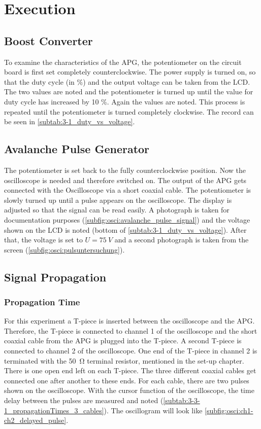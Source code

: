 \chapter{Execution}
    \section{Boost Converter}\label{sec:exec:boost_conv}
        To examine the characteristics of the APG, the potentiometer on the circuit board is first set completely
        counterclockwise. The power supply is turned on, so that the duty cycle (in \%) and the output voltage can be taken from
        the LCD. The two values are noted and the potentiometer is turned up until the value for duty cycle has increased by 10 \%.
        Again the values are noted. This process is repeated until the potentiometer is turned completely clockwise.
        The record can be seen in \cref{subtab:3-1_duty_vs_voltage}.
    \section{Avalanche Pulse Generator}\label{sec:exec:avalanche_p_gen}
        The potentiometer is set back to the fully counterclockwise position. Now the oscilloscope is needed and therefore
        switched on. The output of the APG gets connected with the Oscilloscope via a short coaxial cable. The
        potentiometer is slowly turned up until a pulse appears on the oscilloscope. The display is adjusted so that the signal
        can be read easily. A photograph is taken for documentation purposes (\cref{subfig:osci:avalanche_pulse_signal})
        and the voltage shown on the LCD is noted (bottom of \cref{subtab:3-1_duty_vs_voltage}). After that, the voltage
        is set to \(U = \SI{75}{V}\) and a second photograph is taken from the screen (\cref{subfig:osci:pulsuntersuchung}).
    \section{Signal Propagation}\label{sec:exec:signal_prop}
        \subsection{Propagation Time}\label{subsec:exec:prop_time}
            For this experiment a T-piece is inserted between the oscilloscope and the APG. Therefore, the T-piece is
            connected to channel 1 of the oscilloscope and the short coaxial cable from the APG is plugged into the
            T-piece. A second T-piece is connected to channel 2 of the oscilloscope. One end of the T-piece in channel 2 is terminated
            with the \SI{50}{\ohm} terminal resistor, mentioned in the set-up chapter. There is one open end left on each T-piece.
            The three different coaxial cables get connected one after another to these ends. For each cable, there are two pulses
            shown on the oscilloscope. With the cursor function of the oscilloscope, the time delay between the pulses are measured
            and noted (\cref{subtab:3-3-1_propagationTimes_3_cables}). The oscillogram will look like \cref{subfig:osci:ch1-ch2_delayed_pulse}.

